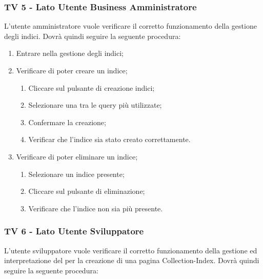 \subsubsection{TV 5 - Lato Utente Business Amministratore}

L’utente amministratore vuole verificare il corretto funzionamento della gestione degli indici.
Dovrà quindi seguire la seguente procedura:

\begin{enumerate}
\item Entrare nella gestione degli indici;
\item Verificare di poter creare un indice;
\begin{enumerate}
\item Cliccare sul pulsante di creazione indici;
\item Selezionare una tra le query più utilizzate;
\item Confermare la creazione;
\item Verificar che l'indice sia stato creato correttamente.
\end{enumerate}
\item Verificare di poter eliminare un indice;
\begin{enumerate}
\item Selezionare un indice presente;
\item Cliccare sul pulsante di eliminazione;
\item Verificare che l'indice non sia più presente.
\end{enumerate}
\end{enumerate}

\subsubsection{TV 6 - Lato Utente Sviluppatore}

L’utente sviluppatore vuole verificare il corretto funzionamento della gestione ed interpretazione del  per la creazione di una pagina Collection-Index.
Dovrà quindi seguire la seguente procedura:

